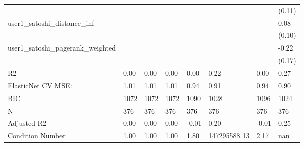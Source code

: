 \begin{table}
\begin{center}
\begin{tabular}{llllllll}
                                                 &          &            &         &         &              &                    & (0.11)   \\
user1_satoshi_distance_inf                       &          &            &         &         &              &                    & 0.08     \\
                                                 &          &            &         &         &              &                    & (0.10)   \\
user1_satoshi_pagerank_weighted                  &          &            &         &         &              &                    & -0.22    \\
                                                 &          &            &         &         &              &                    & (0.17)   \\
R2                                               & 0.00     & 0.00       & 0.00    & 0.00    & 0.22         & 0.00               & 0.27     \\
ElasticNet CV MSE:                               & 1.01     & 1.01       & 1.01    & 0.94    & 0.91         & 0.94               & 0.90     \\
BIC                                              & 1072     & 1072       & 1072    & 1090    & 1028         & 1096               & 1024     \\
N                                                & 376      & 376        & 376     & 376     & 376          & 376                & 376      \\
Adjusted-R2                                      & 0.00     & 0.00       & 0.00    & -0.01   & 0.20         & -0.01              & 0.25     \\
Condition Number                                 & 1.00     & 1.00       & 1.00    & 1.80    & 147295588.13 & 2.17               & nan      \\
\hline
\end{tabular}
\end{center}
\end{table}